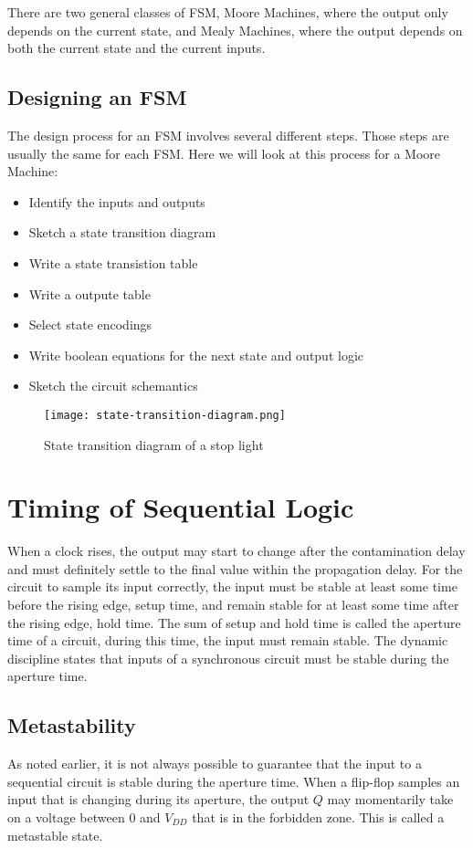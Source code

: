 There are two general classes of FSM, Moore Machines, where the output only depends on the current
state, and Mealy Machines, where the output depends on both the current state and the current inputs.

\subsection{Designing an FSM}

The design process for an FSM involves several different steps. Those steps are usually the same for
each FSM. Here we will look at this process for a Moore Machine:

\begin{itemize}
    \item Identify the inputs and outputs
    \item Sketch a state transition diagram
    \item Write a state transistion table
    \item Write a outpute table
    \item Select state encodings
    \item Write boolean equations for the next state and output logic
    \item Sketch the circuit schemantics
\end{itemize}

\begin{figure}[h]
    \centering
    \texttt{[image: state-transition-diagram.png]}
    \caption{State transition diagram of a stop light}
\end{figure}

\section{Timing of Sequential Logic}

When a clock rises, the output may start to change after the contamination delay and must definitely
settle to the final value within the propagation delay. For the circuit to sample its input correctly,
the input must be stable at least some time before the rising edge, setup time, and remain stable for
at least some time after the rising edge, hold time. The sum of setup and hold time is called the
aperture time of a circuit, during this time, the input must remain stable. The dynamic discipline
states that inputs of a synchronous circuit must be stable during the aperture time.

\subsection{Metastability}
As noted earlier, it is not always possible to guarantee that the input to a sequential circuit is 
stable during the aperture time. When a flip-flop samples an input that is changing during its aperture, 
the output $Q$ may momentarily take on a voltage between $0$ and $V_{DD}$ that is in the forbidden zone. 
This is called a metastable state.

